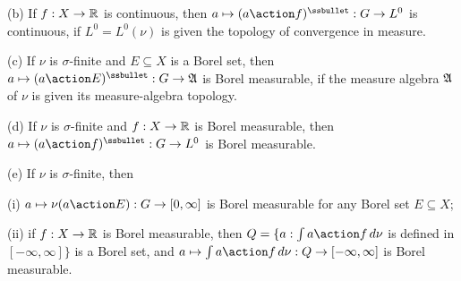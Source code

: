 (b) If $f:X\to\Bbb R$ is continuous, then
$a\mapsto(a\action f)^{\ssbullet}:G\to L^0$ is continuous, if
$L^0=L^0(\nu)$ is given the topology of convergence in measure.

(c) If $\nu$ is $\sigma$-finite and $E\subseteq X$ is a Borel set, then
$a\mapsto(a\action E)^{\ssbullet}:G\to\frak A$ is Borel
measurable, if
the measure algebra $\frak A$ of $\nu$ is given its measure-algebra
topology.

(d) If $\nu$ is $\sigma$-finite and $f:X\to\Bbb R$ is Borel measurable,
then $a\mapsto (a\action f)^{\ssbullet}:G\to L^0$ is Borel measurable.

(e) If $\nu$ is $\sigma$-finite, then

\quad(i)
$a\mapsto\nu(a\action E):G\to[0,\infty]$ is Borel measurable for any
Borel set $E\subseteq X$;

\quad (ii)
if $f:X\to\Bbb R$ is Borel measurable, then $Q=\{a:\int a\action f\,d\nu$
is defined in $[-\infty,\infty]\}$ is a Borel set, and
$a\mapsto\int a\action f\,d\nu:Q\to[-\infty,\infty]$ is Borel measurable.

